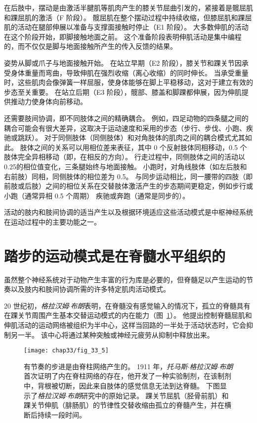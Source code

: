 在后肢中，摆动是由激活半腱肌等肌肉产生的膝关节屈曲引发的，紧接着是髋屈肌和踝屈肌的激活（F 阶段）。
髋屈肌在整个摆动过程中持续收缩，但膝屈肌和踝屈肌的活动在腿部伸展以准备与支撑面接触时停止（E1 阶段）。
大多数伸肌的活动在这个阶段开始，即脚接触地面之前。
这个准备阶段表明伸肌活动是集中编程的，而不仅仅是脚与地面接触所产生的传入反馈的结果。


姿势从脚或爪子与地面接触开始。
在站立早期（E2 阶段），膝关节和踝关节因承受身体重量而弯曲，导致伸肌在强烈收缩（离心收缩）的同时伸长。
当承受重量时，这些肌肉会像弹簧一样屈服，使身体能够在脚上平稳移动，这对于建立有效的步态至关重要。
在站立后期（E3 阶段），髋部、膝盖和脚踝都伸展，因为伸肌提供推动力使身体向前移动。


还需要肢间协调，即不同肢体之间的精确耦合。
例如，四足动物的四条腿之间的耦合可能会有很大差异，这取决于运动速度和采用的步态（步行、步伐、小跑、疾驰或跳跃）。
对于同侧肢体（同侧肢体）和对角肢体的肌肉之间的耦合模式尤其如此。
肢体之间的关系可以用相位差来表征，其中 0 个反射肢体同相移动，0.5 个肢体完全异相移动（即，在相反的方向）。
行走过程中，同侧肢体之间的活动以0.25的相位值变化，三条腿始终与地面接触。
小跑时，对角线肢体（如左后肢和右前肢）同相，同侧肢体的相位差为 0.5。
与同步运动相比，同一腰带的四肢（即前肢或后肢）之间的相位关系在交替肢体激活产生的步态期间更稳定，例如步行或小跑（通常异相 0.5 个周期） 疾驰或奔跑（通常是同步的）。


活动的肢内和肢间协调的适当产生以及根据环境适应这些活动模式是中枢神经系统在运动过程中的主要功能之一。



\section{踏步的运动模式是在脊髓水平组织的}

虽然整个神经系统对于动物产生丰富的行为库是必要的，但脊髓足以产生运动的节奏以及肢内和肢间协调所需的许多特定肌肉活动模式。


20 世纪初，\textit{格拉汉姆$\cdot$布朗}表明，在脊髓没有感觉输入的情况下，孤立的脊髓具有在踝关节周围产生基本交替运动模式的内在能力（图~\ref{fig:33_5}）。
他提出控制脊髓屈肌和伸肌活动的运动网络被组织为半中心，这样当回路的一半处于活动状态时，它会抑制另一半。
该中心将通过某种突触或神经元疲劳从抑制中释放出来。


\begin{figure}[htbp]
	\centering
	\texttt{[image: chap33/fig\_33\_5]}
	\caption{有节奏的步进是由脊柱网络产生的。
	1911 年，\textit{托马斯$\cdot$格拉汉姆$\cdot$布朗}首次证明了内在脊柱网络的存在，他开发了一种实验制剂，在该制剂中，背根被切断，因此来自肢体的感觉信息无法到达脊髓。
	下图显示了\textit{格拉汉姆$\cdot$布朗}研究中的原始记录。
	踝关节屈肌（胫骨前肌）和踝关节伸肌（腓肠肌）的节律性交替收缩由孤立的脊髓产生，并在横断后持续一段时间。}
	\label{fig:33_5}
\end{figure}


